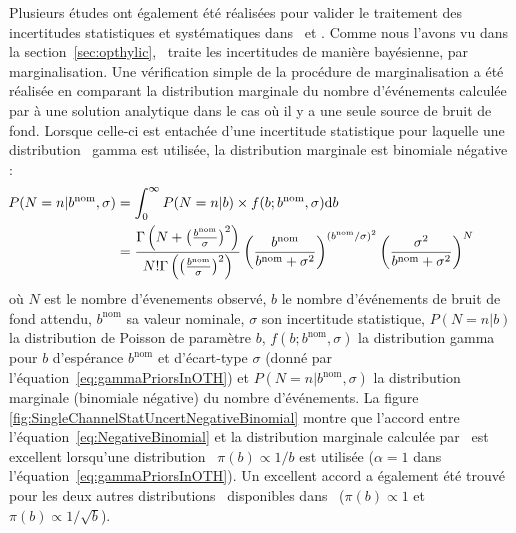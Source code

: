 Plusieurs \'etudes ont \'egalement \'et\'e r\'ealis\'ees pour valider le traitement des incertitudes statistiques et syst\'ematiques dans \opthylic~et \tifosi. 
Comme nous l'avons vu dans la section~\ref{sec:opthylic}, \opthylic~traite les incertitudes de mani\`ere bayésienne, par marginalisation. 
Une v\'erification simple de la proc\'edure de marginalisation a \'et\'e  r\'ealis\'ee en comparant la distribution marginale du nombre d'\'ev\'enements calcul\'ee par \opthylic{} \`a une solution analytique dans le cas o\`u il y a une seule source de bruit de fond.
Lorsque celle-ci est entach\'ee d'une incertitude statistique pour laquelle une distribution \prior~gamma est utilis\'ee, la distribution marginale 
est binomiale n\'egative :
\begin{equation}
\label{eq:NegativeBinomial}
\hspace*{-1cm}
\begin{split}
P(N=n|b^{\text{nom}},\sigma)&=\displaystyle\int_0^\infty P(N=n|b)\times f(b;b^{\text{nom}},\sigma)\dd b\\
 & =\frac{\Gamma\left(N+\left(\frac{b^{\text{nom}}}{\sigma}\right)^2\right)}{N!\Gamma\left(\left(\frac{b^{\text{nom}}}{\sigma}\right)^2\right)}\left(\frac{b^{\text{nom}}}{b^{\text{nom}}+\sigma^2}\right)^{\left(b^{\text{nom}}/\sigma\right)^2}\left(\frac{\sigma^2}{b^{\text{nom}}+\sigma^2}\right)^{N}
\end{split}
\end{equation}
o\`u $N$ est le nombre d'\'evenements observ\'e, $b$ le nombre d'\'ev\'enements de bruit de fond attendu, $b^{\text{nom}}$ sa valeur nominale, $\sigma$ son incertitude statistique, $P(N=n|b)$ la distribution de Poisson de param\`etre $b$, $f(b;b^{\text{nom}},\sigma)$ la distribution gamma pour $b$ d'esp\'erance $b^{\text{nom}}$ et d'\'ecart-type $\sigma$ (donn\'e par l'\'equation~\ref{eq:gammaPriorsInOTH}) et $P(N=n|b^{\text{nom}},\sigma)$ la distribution marginale (binomiale n\'egative) du nombre d'\'ev\'enements. La figure \ref{fig:SingleChannelStatUncertNegativeBinomial} montre que l'accord entre l'\'equation~\ref{eq:NegativeBinomial} et la distribution marginale calcul\'ee par \opthylic~est excellent lorsqu'une distribution \prior~$\pi\left(b\right)\propto 1/b$ est utilis\'ee ($\alpha=1$ dans l'\'equation~\ref{eq:gammaPriorsInOTH}). Un excellent accord a \'egalement \'et\'e trouv\'e pour les deux autres distributions \prior~disponibles dans \opthylic~($\pi\left(b\right)\propto 1$ et $\pi\left(b\right)\propto 1/\sqrt{b}$).

